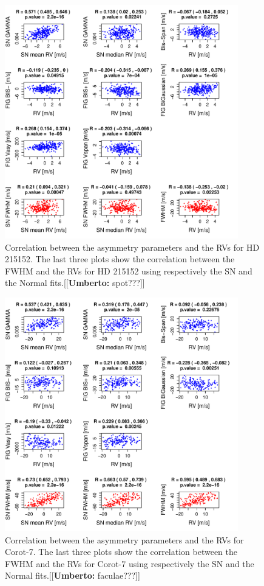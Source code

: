 \documentclass[11pt, oneside]{article}
\newcommand{\umberto}[1]{{\color{green}[[\textbf{Umberto: }#1]]}}
\begin{document}
{\begin{figure}[htbp]
   \centering
\includegraphics[height = 4in]{HD21515_[4]Comparison_para.pdf}  
   \caption{Correlation between the asymmetry parameters and the RVs for HD 215152. The last three plots show the correlation between the FWHM and the RVs for HD 215152 using respectively the SN and the Normal fits.\umberto{spot???}}
   \label{fig:HD215152:corrPlot}
\end{figure}

\begin{figure}[htbp]
   \centering
\includegraphics[height = 4in]{LRa01_E_[4]Comparison_para.pdf} 
   \caption{Correlation between the asymmetry parameters and the RVs for Corot-7. The last three plots show the correlation between the FWHM and the RVs for Corot-7 using respectively the SN and the Normal fits.\umberto{faculae???}}
   \label{fig:Corot7:corrPlot}
\end{figure}

}
\end{document}
